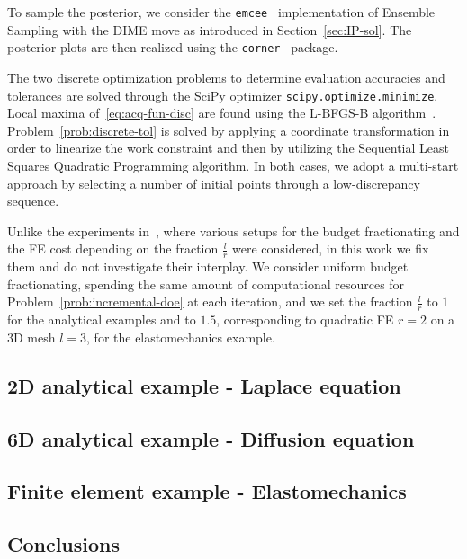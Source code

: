 To sample the posterior, we consider the \texttt{emcee}~\cite{emceePaper} implementation of Ensemble Sampling with the DIME move as introduced in Section~\ref{sec:IP-sol}. 
The posterior plots are then realized using the \texttt{corner}~\cite{corner} package. \medskip

The two discrete optimization problems to determine evaluation accuracies and tolerances are solved through the SciPy optimizer \texttt{scipy.optimize.minimize}. Local maxima of~\eqref{eq:acq-fun-disc} are found using the L-BFGS-B algorithm~\cite{ZhuBirdNocedal}. Problem~\eqref{prob:discrete-tol} is solved by applying a coordinate transformation in order to linearize the work constraint and then by utilizing the Sequential Least Squares Quadratic Programming algorithm. In both cases, we adopt a multi-start approach by selecting a number of initial points through a low-discrepancy sequence. \medskip

Unlike the experiments in~\cite{VillaniArconesUngerWeiser2025}, where various setups for the budget fractionating and the FE cost depending on the fraction $\frac{l}{r}$ were considered, in this work we fix them and do not investigate their interplay.
We consider uniform budget fractionating, spending the same amount of computational resources for Problem~\eqref{prob:incremental-doe} at each iteration, and we set the fraction $\frac{l}{r}$ to $1$ for the analytical examples and to $1.5$, corresponding to quadratic FE $r=2$ on a 3D mesh $l=3$, for the elastomechanics example. \medskip


\subsection{2D analytical example - Laplace equation}\label{sec:2dexp}



\subsection{6D analytical example - Diffusion equation}\label{sec:6dexp}



\subsection{Finite element example - Elastomechanics}\label{sec:FEexp}



\subsection{Conclusions}\label{sec:concl}


\cite{Dinkel2024}